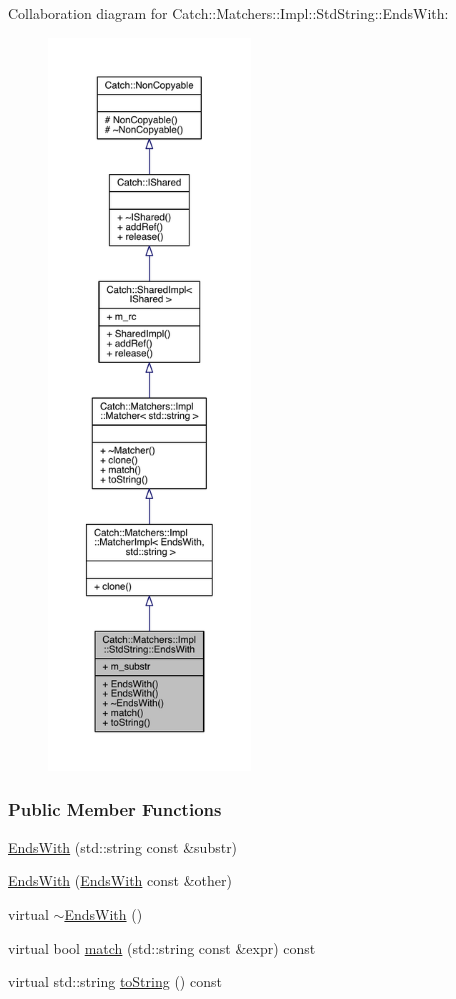 Collaboration diagram for Catch\+:\+:Matchers\+:\+:Impl\+:\+:Std\+String\+:\+:Ends\+With\+:\nopagebreak
\begin{figure}[H]
\begin{center}
\leavevmode
\includegraphics[height=550pt]{a00352}
\end{center}
\end{figure}
\subsubsection*{Public Member Functions}
\begin{DoxyCompactItemize}
\item 
\hyperlink{a00016_a82730175f7f7475ce1ee9791e160d02d}{Ends\+With} (std\+::string const \&substr)
\item 
\hyperlink{a00016_a9321aac07fb17613a7993e99003b3be2}{Ends\+With} (\hyperlink{a00016}{Ends\+With} const \&other)
\item 
virtual \hyperlink{a00016_af0aa8f2d638efd9f9ab9490a2faa3201}{$\sim$\+Ends\+With} ()
\item 
virtual bool \hyperlink{a00016_ad0e03d7f54ffa5859f84faebccf11e76}{match} (std\+::string const \&expr) const 
\item 
virtual std\+::string \hyperlink{a00016_a54715c94c215a1fc5fb6336acf52eb06}{to\+String} () const 
\end{DoxyCompactItemize}
